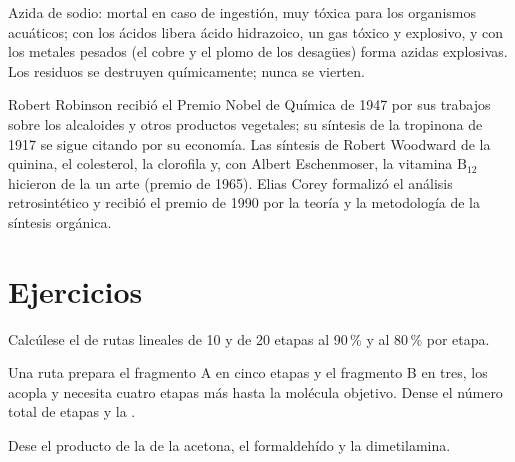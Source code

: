 \begin{safety}{}
Azida de sodio: mortal en caso de ingestión, muy tóxica para los organismos acuáticos; con los ácidos
libera ácido hidrazoico, un gas tóxico y explosivo, y con los metales pesados
(el cobre y el plomo de los desagües) forma azidas explosivas. Los residuos se destruyen
químicamente; nunca se vierten.
\end{safety}

\begin{history}
Robert Robinson recibió el Premio Nobel de Química de 1947 por sus trabajos sobre los
alcaloides y otros productos vegetales; su síntesis de la tropinona de 1917 se sigue
citando por su economía. Las síntesis de Robert Woodward de la quinina, el colesterol, la
clorofila y, con Albert Eschenmoser, la vitamina $\mathrm B_{12}$ hicieron de la  un arte
(premio de 1965). Elias Corey formalizó el análisis retrosintético y recibió el
premio de 1990 por la teoría y la metodología de la síntesis orgánica.
\end{history}

\section{Ejercicios}

\begin{exercise}[$\star$]\label{exo:b3:total-synthesis:1}
Calcúlese el  de rutas lineales de 10 y de 20 etapas al 90\,\% y al 80\,\% por
etapa.
\end{exercise}

\begin{exercise}[$\star$]\label{exo:b3:total-synthesis:2}
Una ruta prepara el fragmento A en cinco etapas y el fragmento B en tres, los acopla y
necesita cuatro etapas más hasta la molécula objetivo. Dense el número total de etapas y la
.
\end{exercise}

\begin{exercise}[$\star$]\label{exo:b3:total-synthesis:3}
Dese el producto de la  de la acetona, el formaldehído y la
dimetilamina.
\end{exercise}

